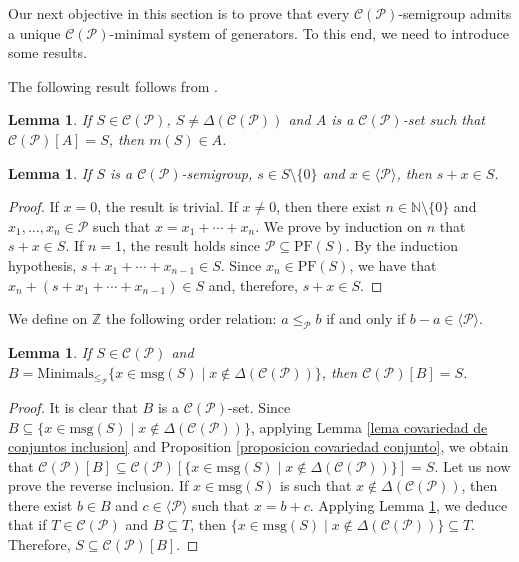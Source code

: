 \documentclass[11pt]{article}
\def\N{\mathbb{N}}
\newtheorem{lemma}[theorem]{Lemma}
\numberwithin{equation}{section}
\begin{document}
Our next objective in this section is to prove that every $\mathcal C(\mathcal P)$-semigroup admits a unique $\mathcal C(\mathcal P)$-minimal system of generators. To this end, we need to introduce some results.

The following result follows from \cite[Lemma 5.1]{covariedades}.

\begin{lemma}
    If $S\in\mathcal C(\mathcal P)$, $S\ne\Delta(\mathcal C(\mathcal P))$ and $A$ is a $\mathcal C(\mathcal P)$-set such that $\mathcal C(\mathcal P)[A]=S$, then $m(S)\in A$.
\end{lemma}

\begin{lemma}\label{lema covariedad x+s}
    If $S$ is a $\mathcal C(\mathcal P)$-semigroup, $s\in S\setminus\{0\}$ and $x\in\langle\mathcal P\rangle$, then $s+x\in S$.
\end{lemma}

\begin{proof}
    If $x=0$, the result is trivial. If $x\ne0$, then there exist $n\in\N\setminus\{0\}$ and $x_1,\ldots,x_n\in\mathcal P$ such that $x=x_1+\cdots+x_n$. We prove by induction on $n$ that $s+x\in S$. If $n=1$, the result holds since $\mathcal P\subseteq \mathrm{PF}(S)$. By the induction hypothesis, $s+x_1+\cdots+x_{n-1}\in S$. Since $x_n\in\mathrm{PF}(S)$, we have that $x_n+(s+x_1+\cdots+x_{n-1})\in S$ and, therefore, $s+x\in S$.
\end{proof}

We define on $\mathbb Z$ the following order relation: $a\leq_\mathcal P b$ if and only if $b-a\in\langle\mathcal P\rangle$.

\begin{lemma}\label{lema minimales y B}
    If $S\in\mathcal C(\mathcal P)$ and $B=\mathrm{Minimals}_{\leq_{\mathcal P}}\{x\in\mathrm{msg}(S) \mid x\notin\Delta(\mathcal C(\mathcal P))\}$, then $\mathcal C(\mathcal P)[B]=S$.
\end{lemma}

\begin{proof}
    It is clear that $B$ is a $\mathcal C(\mathcal P)$-set. Since $B\subseteq\{x\in\mathrm{msg}(S)\mid x\notin\Delta(\mathcal C(\mathcal P)) \}$, applying Lemma \ref{lema covariedad de conjuntos inclusion} and Proposition \ref{proposicion covariedad conjunto}, we obtain that $\mathcal C(\mathcal P)[B]\subseteq \mathcal C(\mathcal P)[\{x\in\mathrm{msg}(S)\mid x\notin\Delta(\mathcal C(\mathcal P))\}]=S$. Let us now prove the reverse inclusion. If $x\in\mathrm{msg}(S)$ is such that $x\notin\Delta(\mathcal C(\mathcal P))$, then there exist $b\in B$ and $c\in\langle\mathcal P\rangle$ such that $x=b+c$. Applying Lemma \ref{lema covariedad x+s}, we deduce that if $T\in\mathcal C(\mathcal P)$ and $B\subseteq T$, then $\{x\in\mathrm{msg}(S)\mid x\notin\Delta(\mathcal C(\mathcal P))\}\subseteq T$. Therefore, $S\subseteq\mathcal C(\mathcal P)[B]$.
\end{proof}
\end{document}
